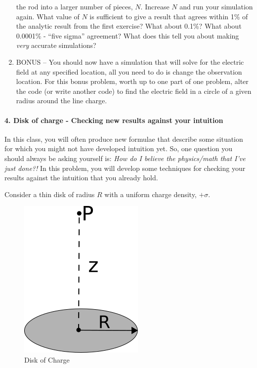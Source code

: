 \documentclass[11pt]{article}
\begin{document}
\begin{enumerate}
  the rod into a larger number of pieces, \(N\). Increase \(N\) and run
  your simulation again. What value of \(N\) is sufficient to give a
  result that agrees within 1\% of the analytic result from the first
  exercise? What about 0.1\%? What about 0.0001\% - ``five sigma''
  agreement? What does this tell you about making \emph{very} accurate
  simulations?
\item
  BONUS -- You should now have a simulation that will solve for the
  electric field at any specified location, all you need to do is change
  the observation location. For this bonus problem, worth up to one part
  of one problem, alter the code (or write another code) to find the
  electric field in a circle of a given radius around the line charge.
\end{enumerate}

\paragraph{4. Disk of charge - Checking new results against your
intuition}\label{disk-of-charge---checking-new-results-against-your-intuition}

In this class, you will often produce new formulae that describe some
situation for which you might not have developed intuition yet. So, one
question you should always be asking yourself is: \emph{How do I believe
the physics/math that I've just done?!} In this problem, you will
develop some techniques for checking your results against the intuition
that you already hold.

Consider a thin disk of radius \(R\) with a uniform charge density,
\(+\sigma\).

\begin{figure}[htbp]
\centering
\includegraphics{./images/hw2/disk_of_charge.png}
\caption{Disk of Charge}
\end{figure}
\end{document}
